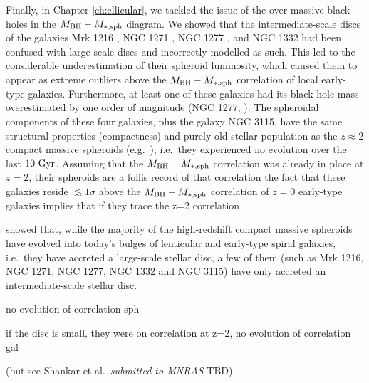Finally, in Chapter \ref{ch:ellicular}, 
we tackled the issue of the over-massive black holes in the $M_{\rm BH} - M_{\rm *,sph}$ diagram. 
We showed that the intermediate-scale discs of the galaxies Mrk 1216 \citep{yildirim2015}, NGC 1271 \citep{walsh2015}, 
NGC 1277 \citep{vandenbosch2012}, and NGC 1332 \citep{rusli2011} 
had been confused with large-scale discs and incorrectly modelled as such. 
This led to the considerable underestimation of their spheroid luminosity, 
which caused them to appear as extreme outliers above the $M_{\rm BH} - M_{\rm *,sph}$ correlation 
of local early-type galaxies. 
Furthermore, at least one of these galaxies had its black hole mass overestimated by one order of magnitude 
(NGC 1277, \citealt{Graham2016n1277}). 
The spheroidal components of these four galaxies, plus the galaxy NGC 3115, 
have the same structural properties (compactness) and purely old stellar population 
as the $z \approx 2$ compact massive spheroids (e.g.~\citealt{daddi2005,trujillo2006,vandokkum2008,damjanov2009}), 
i.e.~they experienced no evolution over the last $10 \rm~Gyr$. 
Assuming that the $M_{\rm BH} - M_{\rm *,sph}$ correlation was already in place at $z=2$, 
their spheroids are a follis record of that correlation
the fact that these galaxies reside $\lesssim 1\sigma$ above the $M_{\rm BH} - M_{\rm *,sph}$ correlation 
of $z=0$ early-type galaxies 
implies that 
if they trace the z=2 correlation




\cite{gds2015} showed that, while the majority of the high-redshift compact massive spheroids 
have evolved into today's bulges of lenticular and early-type spiral galaxies, 
i.e.~they have accreted a large-scale stellar disc, 
a few of them (such as Mrk 1216, NGC 1271, NGC 1277, NGC 1332 and NGC 3115) 
have only accreted an intermediate-scale stellar disc. 

no evolution of correlation  sph

if the disc is small, they were on correlation at z=2, no evolution of correlation gal

(but see Shankar et al.~\emph{submitted to MNRAS} TBD). \\




 

